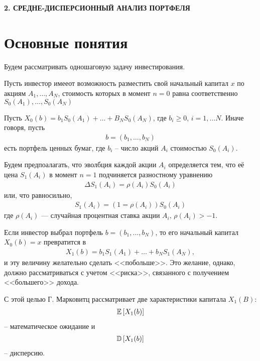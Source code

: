 \newpage
\begin{center}
	\textbf{\large 2. СРЕДНЕ-ДИСПЕРСИОННЫЙ АНАЛИЗ ПОРТФЕЛЯ}
\end{center}

\section{Основные понятия}

Будем рассматривать одношаговую задачу инвестирования.

Пусть инвестор имееот возможность разместить свой начальный капитал $x$ по акциям $A_1, \dots, A_N$, стоимость которых 
в момент $n=0$ равна соответственно
$S_0(A_1), \dots, S_0(A_N)$

Пусть $X_0(b) = b_1 S_0(A_1) + \dots + B_N S_0(A_N)$, где $b_i \ge 0$, $i=1, \dots N$. Иначе говоря, пусть
\begin{align}
b = (b_1, \dots, b_N )
\end{align}
есть портфель ценных бумаг, где $b_i$ -- число акций $A_i$ стоимостью $S_0(A_i)$.

Будем предпоалагать, что эволбция каждой акции $A_i$ определяется тем, что её цена $S_1(A_i)$ в момент $n=1$ подчиняется 
разностному уравнению
\begin{align}
\Delta S_1(A_i) = \rho(A_i) S_0(A_i)
\end{align}
или, что равносильно,
\begin{align}
S_1(A_i) = (1 = \rho(A_i))S_0(A_i)
\end{align}
где $\rho(A_i)$ --- случайная процентная ставка акции $A_i$, $\rho(A_i) > -1$.

Если инвестор выбрал портфель $b = (b_1, \dots, b_N )$, то его начальный капитал $X_0(b) = x$ превратится в 
\begin{align}
X_1(b) = b_1 S_1(A_1) + \dots + b_N S_1(A_N),
\end{align}
и эту величину желательно сделать <<побольше>>. Это желание, однако, должно рассматриваться с учетом <<риска>>, 
связанного с получением <<большего>> дохода.

С этой целью Г. Марковитц рассматривает две характеристики капитала $X_1(B)$:
\begin{align}
\mathbb{E}\left[X_1(b)\right]
\end{align} -- математическое ожидание
и
\begin{align}
\mathbb{D}\left[X_1(b)\right]
\end{align} -- дисперсию.

